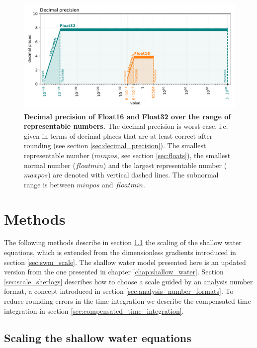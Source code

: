 \begin{figure}[tbhp]
	\includegraphics[width=1\textwidth]{Figures/a64fx/float32_16_decprec.pdf}
	\caption{\textbf{Decimal precision of Float16 and Float32 over the range of representable numbers.}
	The decimal precision is worst-case, i.e. given in terms of decimal places that are at least correct after rounding (see section
	\ref{sec:decimal_precision}). The smallest representable number ($minpos$, see section \ref{sec:floats}), the smallest normal
	number ($floatmin$) and the largest representable number ($maxpos$) are denoted with vertical dashed lines. The subnormal
	range is between $minpos$ and $floatmin$.}
	\label{fig:a64fx_decprec}
\end{figure}

\section{Methods}
\label{sec:hardware_methods}

 The following methods describe in section \ref{sec:swm_scaling} the scaling of the shallow water equations, which is extended from 
 the dimensionless gradients introduced in section \ref{sec:swm_scale}. The shallow water model presented here is an updated
 version from the one presented in chapter \ref{chap:shallow_water}. Section \ref{sec:scale_sherlogs} describes how to choose a scale
 guided by an analysis number format, a concept introduced in section \ref{sec:analysis_number_formats}. To reduce rounding errors
 in the time integration we describe the compensated time integration in section \ref{sec:compensated_time_integration}.

\subsection{Scaling the shallow water equations}
\label{sec:swm_scaling}

